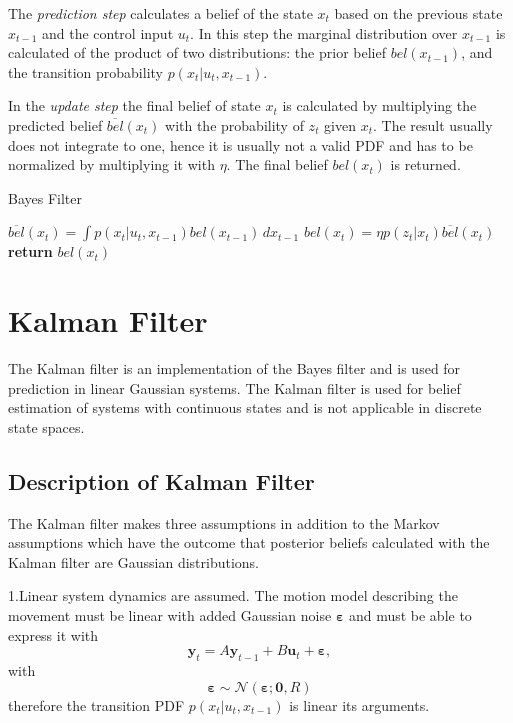 \documentclass[12pt,oneside,openany,a4paper, %
afrikaans,english,
]{memoir}
\numberwithin{equation}{chapter}
\begin{document}
The \textit{prediction step} calculates a belief of the state $x_t$ based on the previous state $x_{t-1}$ and the control input $u_t$. In this step the marginal distribution over $x_{t-1}$ is calculated of the product of two distributions: the prior belief $bel(x_{t-1})$, and the  transition probability $p(x_t|u_t,x_{t-1})$.

In the \textit{update step} the final belief of state $x_t$ is calculated by multiplying the predicted belief $\overline{bel}(x_t)$ with the probability of $z_t$ given $x_t$. The result usually does not integrate to one, hence it is usually not a valid PDF and has to be normalized by multiplying it with $\eta$. The final belief $bel(x_t)$ is returned.
\begin{algorithm}
\caption{Bayes Filter}\label{bayesAlg}
\begin{algorithmic}[1]
\State $\overline{bel}(x_t) = \int p(x_t|u_t, x_{t-1})bel(x_{t-1})\, dx_{t-1}$
\State $bel(x_t) = \eta p(z_t|x_t) \overline{bel} (x_t)$
\EndFor
\State \textbf{return} $bel(x_t)$
\EndProcedure
\end{algorithmic}
\end{algorithm}

\section{Kalman Filter}
The Kalman filter is an implementation of the Bayes filter and is used for prediction in linear Gaussian systems. The Kalman filter is used for belief estimation of systems with continuous states and is not applicable in discrete state spaces. 
\subsection{Description of Kalman Filter}
The Kalman filter makes three assumptions in addition to the Markov assumptions which have the outcome that posterior beliefs calculated with the Kalman filter are Gaussian distributions.

1.Linear system dynamics are assumed. The motion model describing the movement must be linear with added Gaussian noise $\bm{\varepsilon}$ and must be able to express it with 
\begin{equation}\label{eq:linearKmm}
\bm{y}_t = A \bm{y}_{t - 1} + B \bm{u}_t + \bm{\varepsilon},
\end{equation}
with 
\begin{equation}
\bm{\varepsilon} \sim \mathcal{N}(\bm{\varepsilon}; \bm{0}, R)
\end{equation}
therefore the transition PDF $p(x_t|u_t, x_{t-1})$ is linear its arguments.
\end{document}
